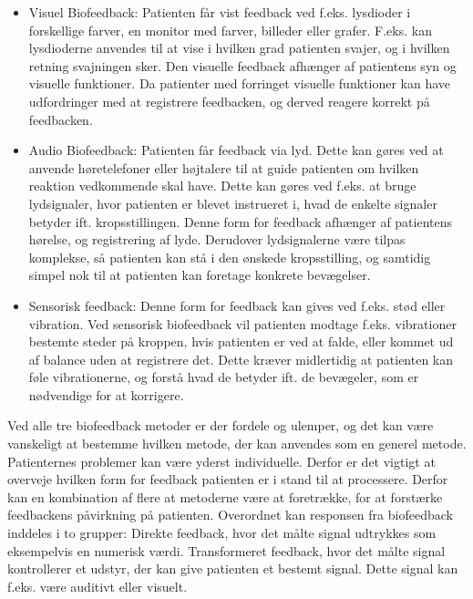 \begin{itemize}
\item Visuel Biofeedback: Patienten får vist feedback ved f.eks. lysdioder i forskellige farver, en monitor med farver, billeder eller grafer. F.eks. kan lysdioderne anvendes til at vise i hvilken grad patienten svajer, og i hvilken retning svajningen sker.
Den visuelle feedback afhænger af patientens syn og visuelle funktioner. Da patienter med forringet visuelle funktioner kan have udfordringer med at registrere feedbacken, og derved reagere korrekt på feedbacken.   

\item Audio Biofeedback: Patienten får feedback via lyd. Dette kan gøres ved at anvende høretelefoner eller højtalere til at guide patienten om hvilken reaktion vedkommende skal have. Dette kan gøres ved f.eks. at bruge lydsignaler, hvor patienten er blevet instrueret i, hvad de enkelte signaler betyder ift. kropsstillingen. 
Denne form for feedback afhænger af patientens hørelse, og registrering af lyde. Derudover lydsignalerne være tilpas komplekse, så patienten kan stå i den ønskede kropsstilling, og samtidig simpel nok til at patienten kan foretage konkrete bevægelser. 

\item Sensorisk feedback: Denne form for feedback kan gives ved f.eks. stød eller vibration. Ved sensorisk biofeedback vil patienten modtage f.eks. vibrationer bestemte steder på kroppen, hvis patienten er ved at falde, eller kommet ud af balance uden at registrere det. Dette kræver midlertidig at patienten kan føle vibrationerne, og forstå hvad de betyder ift. de bevægeler, som er nødvendige for at korrigere.           
\end{itemize}
 
Ved alle tre biofeedback metoder er der fordele og ulemper, og det kan være vanskeligt at bestemme hvilken metode, der kan anvendes som en generel metode. Patienternes problemer kan være yderst individuelle. Derfor er det vigtigt at overveje hvilken form for feedback patienten er i stand til at processere. Derfor kan en kombination af flere at metoderne være at foretrække, for at forstærke feedbackens påvirkning på patienten. 
Overordnet kan responsen fra biofeedback inddeles i to grupper: Direkte feedback, hvor det målte signal udtrykkes som eksempelvis en numerisk værdi. Transformeret feedback, hvor det målte signal kontrollerer et udstyr, der kan give patienten et bestemt signal. Dette signal kan f.eks. være auditivt eller visuelt. \cite{Giggins2013} 

